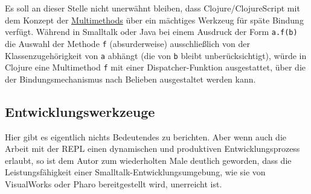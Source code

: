 \documentclass[11pt]{article}
\begin{document}
Es soll an dieser Stelle nicht unerwähnt bleiben, dass
Clojure/ClojureScript mit dem Konzept der \href{https://clojure.org/reference/multimethods}{Multimethods} über ein
mächtiges Werkzeug für späte Bindung verfügt. Während in Smalltalk
oder Java bei einem Ausdruck der Form \texttt{a.f(b)} die Auswahl der Methode
\texttt{f} (absurderweise) ausschließlich von der Klassenzugehörigkeit von
\texttt{a} abhängt (die von \texttt{b} bleibt unberücksichtigt), würde in Clojure
eine Multimethod \texttt{f} mit einer Dispatcher-Funktion ausgestattet, über
die der Bindungsmechanismus nach Belieben ausgestaltet werden kann.

\subsection*{Entwicklungswerkzeuge}
\label{sec:org93ef10d}

Hier gibt es eigentlich nichts Bedeutendes zu berichten. Aber wenn
auch die Arbeit mit der REPL einen dynamischen und produktiven
Entwicklungsprozess erlaubt, so ist dem Autor zum wiederholten Male
deutlich geworden, dass die Leistungsfähigkeit einer
Smalltalk-Entwicklungsumgebung, wie sie von VisualWorks oder Pharo
bereitgestellt wird, unerreicht ist.
\end{document}
